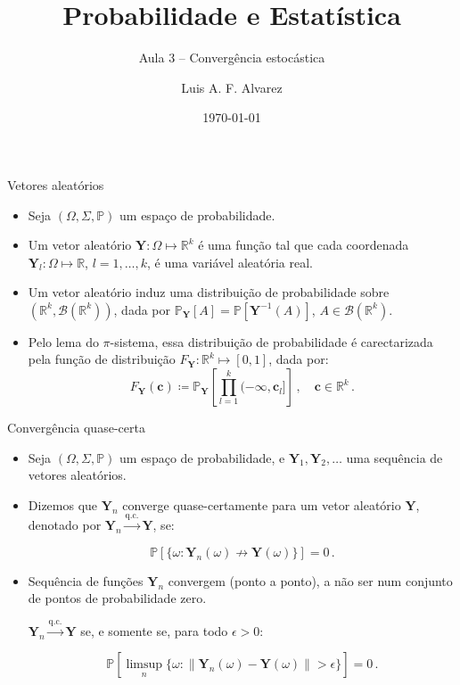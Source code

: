 \documentclass[11pt]{beamer}
\author{Luis A. F. Alvarez}
\title{Probabilidade e Estatística}
\subtitle{Aula 3 -- Convergência estocástica}
\date{\today}
\begin{document}
	
	\maketitle
	
	\begin{frame}{Vetores aleatórios}
		\begin{itemize}
			\item Seja $(\Omega,\Sigma,\mathbb{P})$ um espaço de probabilidade.
			\item Um vetor aleatório $\boldsymbol{Y}: \Omega \mapsto \mathbb{R}^k$ é uma função tal que cada coordenada $\boldsymbol{Y}_l : \Omega \mapsto \mathbb{R}$, $l=1,\ldots, k$, é uma variável aleatória real.
			\item Um vetor aleatório induz uma distribuição de probabilidade sobre $(\mathbb{R}^k,\mathcal{B}(\mathbb{R}^k))$, dada por $\mathbb{P}_{\boldsymbol{Y}}[A] = \mathbb{P}[\boldsymbol{Y}^{-1}(A)]$, $A \in \mathcal{B}(\mathbb{R}^k)$.
			\item Pelo lema do $\pi$-sistema, essa distribuição de probabilidade é carectarizada pela função de distribuição $F_{\boldsymbol{Y}}: \mathbb{R}^k \mapsto [0,1]$, dada por:
			$$F_{\boldsymbol{Y}}(\boldsymbol{c}) \coloneqq \mathbb{P}_{\boldsymbol{Y}}\left[\prod_{l=1}^k (-\infty,\boldsymbol{c}_l]\right]\, , \quad \boldsymbol{c} \in \mathbb{R}^k\, .$$
			
		\end{itemize}

	\end{frame}
	\begin{frame}{Convergência quase-certa}
		\begin{itemize}
			\item  Seja $(\Omega,\Sigma,\mathbb{P})$ um espaço de probabilidade, e $\boldsymbol{Y}_1,\boldsymbol{Y}_2,\ldots$ uma sequência de vetores aleatórios.
			\item Dizemos que $\boldsymbol{Y}_n$ converge quase-certamente para um vetor aleatório $\boldsymbol{Y}$, denotado por $\boldsymbol{Y}_n \overset{\text{q.c.}}{\to} \boldsymbol{Y}$, se:
			
			$$\mathbb{P}[\{\omega: \boldsymbol{Y}_n(\omega) \nrightarrow \boldsymbol{Y}(\omega)\}] = 0\, .$$
			\item Sequência de funções $\boldsymbol{Y}_n$ convergem (ponto a ponto), a não ser num conjunto de pontos de probabilidade zero.
			
			\begin{lemma}
				$\boldsymbol{Y}_n \overset{\text{q.c.}}{\to} \boldsymbol{Y}$ se, e somente se, para todo $\epsilon > 0$:
				
			$$\mathbb{P}\left[\limsup_n \{\omega: \lVert\boldsymbol{Y}_n(\omega)-\boldsymbol{Y}(\omega)\rVert > \epsilon\}\right]=0\, .$$
			\end{lemma} 
		\end{itemize}

	\end{frame}
	
\end{document}

